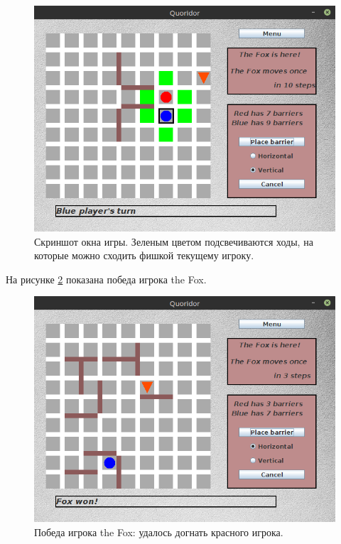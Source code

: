 \documentclass[a4paper]{article}
\begin{document}
\begin{figure}[H]
	\begin{center}
		\includegraphics[scale=0.5]{gameGUI1}
		\caption{Скриншот окна игры. Зеленым цветом подсвечиваются ходы, на которые можно сходить фишкой текущему игроку.} 
		\label{pic:gameGUI1} %
	\end{center}
\end{figure}


На рисунке \ref{pic:gameGUI2} показана победа игрока the Fox.

\begin{figure}[H]
	\begin{center}
		\includegraphics[scale=0.5]{gameGUI2}
		\caption{Победа игрока the Fox: удалось догнать красного игрока.} 
		\label{pic:gameGUI2} %
	\end{center}
\end{figure}
\end{document}
